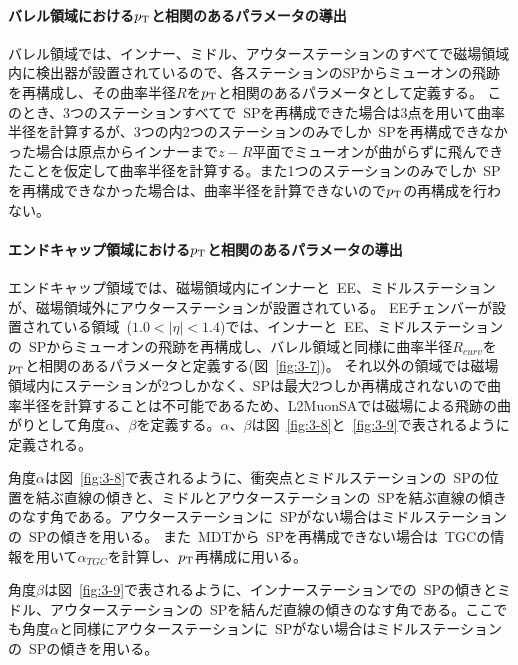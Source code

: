 \paragraph{バレル領域における$p_\mathrm{T}$と相関のあるパラメータの導出}
バレル領域では、インナー、ミドル、アウターステーションのすべてで磁場領域内に検出器が設置されているので、各ステーションのSPからミューオンの飛跡を再構成し、その曲率半径$R$を$p_\mathrm{T}$と相関のあるパラメータとして定義する。
このとき、3つのステーションすべてで~SPを再構成できた場合は3点を用いて曲率半径を計算するが、3つの内2つのステーションのみでしか~SPを再構成できなかった場合は原点からインナーまで$z-R$平面でミューオンが曲がらずに飛んできたことを仮定して曲率半径を計算する。また1つのステーションのみでしか~SPを再構成できなかった場合は、曲率半径を計算できないので$p_\mathrm{T}$の再構成を行わない。


\paragraph{エンドキャップ領域における$p_\mathrm{T}$と相関のあるパラメータの導出}
エンドキャップ領域では、磁場領域内にインナーと~EE、ミドルステーションが、磁場領域外にアウターステーションが設置されている。
EEチェンバーが設置されている領域~($1.0<|\eta|<1.4$)では、インナーと~EE、ミドルステーションの~SPからミューオンの飛跡を再構成し、バレル領域と同様に曲率半径$R_{curv}$を$p_\mathrm{T}$と相関のあるパラメータと定義する(図~\ref{fig:3-7})。
それ以外の領域では磁場領域内にステーションが2つしかなく、SPは最大2つしか再構成されないので曲率半径を計算することは不可能であるため、L2MuonSAでは磁場による飛跡の曲がりとして角度$\alpha$、$\beta$を定義する。$\alpha$、$\beta$は図~\ref{fig:3-8}と~\ref{fig:3-9}で表されるように定義される。

角度$\alpha$は図~\ref{fig:3-8}で表されるように、衝突点とミドルステーションの~SPの位置を結ぶ直線の傾きと、ミドルとアウターステーションの~SPを結ぶ直線の傾きのなす角である。アウターステーションに~SPがない場合はミドルステーションの~SPの傾きを用いる。
また~MDTから~SPを再構成できない場合は~TGCの情報を用いて$\alpha_{TGC}$を計算し、$p_\mathrm{T}$再構成に用いる。

角度$\beta$は図~\ref{fig:3-9}で表されるように、インナーステーションでの~SPの傾きとミドル、アウターステーションの~SPを結んだ直線の傾きのなす角である。ここでも角度$\alpha$と同様にアウターステーションに~SPがない場合はミドルステーションの~SPの傾きを用いる。

